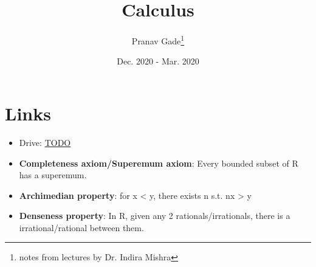 \documentclass[10pt, a4paper]{report}
\author{Pranav Gade\thanks{notes from lectures by Dr. Indira Mishra}}
\date{Dec. 2020 - Mar. 2020}
\title{Calculus}
\begin{document}
	\maketitle
	\section*{Links}
	\begin{itemize}
		\item Drive: \href{}{TODO}
	\end{itemize}
	\newpage
	
	\begin{itemize}
		\item \textbf{Completeness axiom/Superemum axiom}: Every bounded subset of R has a superemum.
		\item \textbf{Archimedian property}: for x < y, there exists n s.t. nx > y
		\item \textbf{Denseness property}: In R, given any 2 rationals/irrationals, there is a irrational/rational between them.
	\end{itemize}
\end{document}
